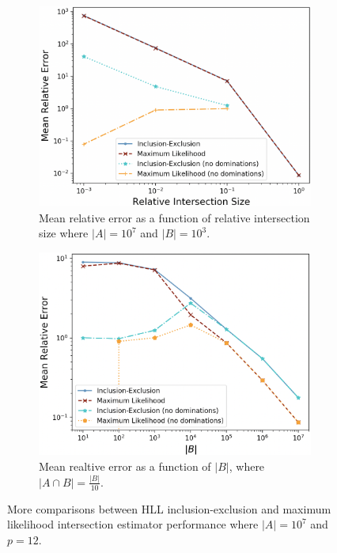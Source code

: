 \documentclass[10]{article}
\newcommand{\algoname}[1]{\textnormal{\textsc{#1}}}
\begin{document}
\begin{figure}
	\begin{center}
		\begin{subfigure}{0.49\linewidth}
			\centerline{\includegraphics[width=1.0\columnwidth]{relative_intersection_size_vs_relative_error_small}}
			\caption{Mean relative error as a function of relative intersection size where $|A| = 10^7$ and $|B| = 10^3$. \label{fig:relative_intersection_size_small}}
		\end{subfigure}
		\begin{subfigure}{0.49\linewidth}
			\centerline{\includegraphics[width=1.0\columnwidth]{B_size_vs_relative_error_tenth_intersection.png}}
			\caption{Mean realtive error as a function of $|B|$, where \\ $|A \cap B| = \frac{|B|}{10}$. \label{fig:relative_B_size}}
		\end{subfigure}
		\caption{More comparisons between \algoname{HLL} inclusion-exclusion and maximum likelihood intersection estimator performance where $|A| = 10^7$ and $p = 12$.
			\label{fig:more_intersection_comparisons}}
	\end{center}
\end{figure}
\end{document}
